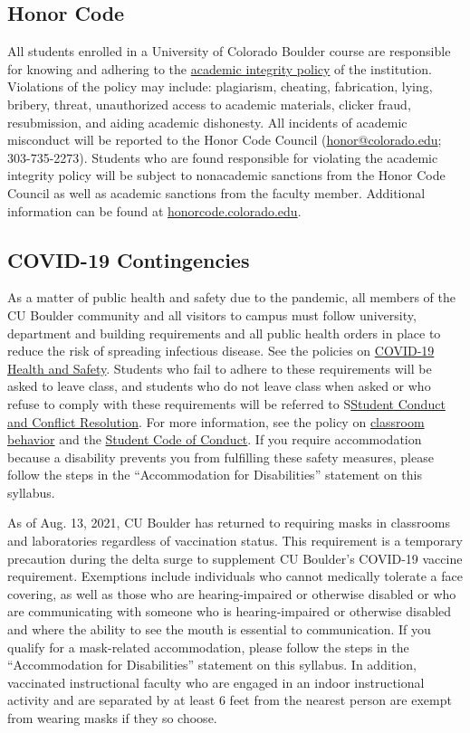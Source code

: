 \documentclass[11pt]{memoir}
\begin{document}
\subsection{Honor Code}
All students enrolled in a University of Colorado Boulder course are responsible for knowing and adhering to the \href{http://www.colorado.edu/policies/academic-integrity-policy}{academic integrity policy} of the institution. Violations of the policy may include: plagiarism, cheating, fabrication, lying, bribery, threat, unauthorized access to academic materials, clicker fraud, resubmission, and aiding academic dishonesty. All incidents of academic misconduct will be reported to the Honor Code Council (\href{mailto:honor@colorado.edu}{honor@colorado.edu}; 303-735-2273). Students who are found responsible for violating the academic integrity policy will be subject to nonacademic sanctions from the Honor Code Council as well as academic sanctions from the faculty member. Additional information can be found at \href{http://honorcode.colorado.edu}{honorcode.colorado.edu}. 

\subsection{COVID-19 Contingencies}
As a matter of public health and safety due to the pandemic, all members of the CU Boulder community and all visitors to campus must follow university, department and building requirements and all public health orders in place to reduce the risk of spreading infectious disease. See the policies on \href{https://www.colorado.edu/policies/covid-19-health-and-safety-policy}{COVID-19 Health and Safety}. Students who fail to adhere to these requirements will be asked to leave class, and students who do not leave class when asked or who refuse to comply with these requirements will be referred to S\href{https://www.colorado.edu/sccr/}{Student Conduct and Conflict Resolution}. For more information, see the policy on \href{http://www.colorado.edu/policies/student-classroom-and-course-related-behavior}{classroom behavior} and the \href{http://www.colorado.edu/osccr/}{Student Code of Conduct}. If you require accommodation because a disability prevents you from fulfilling these safety measures, please follow the steps in the “Accommodation for Disabilities” statement on this syllabus.

As of Aug. 13, 2021, CU Boulder has returned to requiring masks in classrooms and laboratories regardless of vaccination status. This requirement is a temporary precaution during the delta surge to supplement CU Boulder’s COVID-19 vaccine requirement. Exemptions include individuals who cannot medically tolerate a face covering, as well as those who are hearing-impaired or otherwise disabled or who are communicating with someone who is hearing-impaired or otherwise disabled and where the ability to see the mouth is essential to communication. If you qualify for a mask-related accommodation, please follow the steps in the “Accommodation for Disabilities” statement on this syllabus. In addition, vaccinated instructional faculty who are engaged in an indoor instructional activity and are separated by at least 6 feet from the nearest person are exempt from wearing masks if they so choose.
\end{document}
